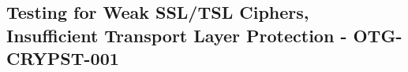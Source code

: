 \subsection{Testing for Weak SSL/TSL Ciphers, Insufficient Transport Layer Protection - OTG-CRYPST-001}
\clearpage